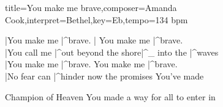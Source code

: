 \documentclass{leadsheet}
\begin{document}
\begin{song}{title={You make me brave},composer={Amanda Cook},interpret={Bethel},key={Eb},tempo={134 bpm}}
\begin{bridge}[numbered=true]
|You make me |^brave. | You make me |^brave. \\
|You call me |^out beyond the shore|^\_ into the |^waves \\
|You make me |^brave. You make me |^brave. \\
|No fear can |^hinder now the promises You've made
\end{bridge}

\begin{outro}
Champion of Heaven
You made a way for all to enter in
\end{outro}

\end{song}
\end{document}
